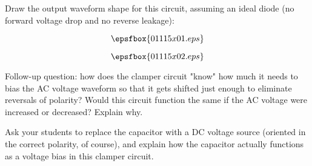 

Draw the output waveform shape for this circuit, assuming an ideal diode (no forward voltage drop and no reverse leakage):

$$\epsfbox{01115x01.eps}$$







$$\epsfbox{01115x02.eps}$$

\vskip 10pt

Follow-up question: how does the clamper circuit "know" how much it needs to bias the AC voltage waveform so that it gets shifted just enough to eliminate reversals of polarity?  Would this circuit function the same if the AC voltage were increased or decreased?  Explain why.







Ask your students to replace the capacitor with a DC voltage source (oriented in the correct polarity, of course), and explain how the capacitor actually functions as a voltage bias in this clamper circuit.




